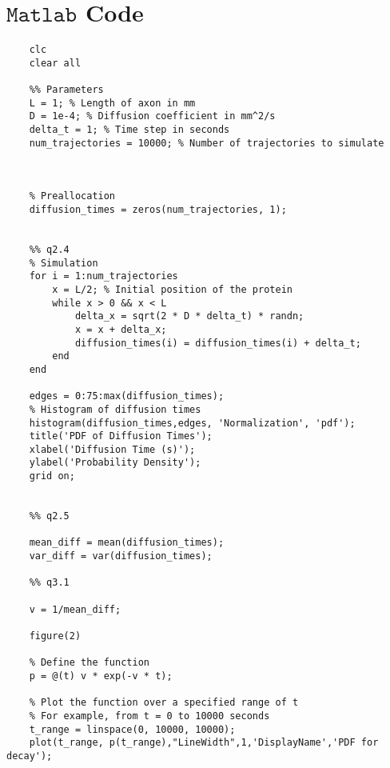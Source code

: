 \appendix

\section{$\mathtt{Matlab}$ Code}

\begin{lstlisting}
    clc
    clear all
    
    %% Parameters
    L = 1; % Length of axon in mm
    D = 1e-4; % Diffusion coefficient in mm^2/s
    delta_t = 1; % Time step in seconds
    num_trajectories = 10000; % Number of trajectories to simulate
    
    
    
    % Preallocation
    diffusion_times = zeros(num_trajectories, 1);
    
    
    %% q2.4
    % Simulation
    for i = 1:num_trajectories
        x = L/2; % Initial position of the protein
        while x > 0 && x < L
            delta_x = sqrt(2 * D * delta_t) * randn;
            x = x + delta_x;
            diffusion_times(i) = diffusion_times(i) + delta_t;
        end
    end
    
    edges = 0:75:max(diffusion_times);
    % Histogram of diffusion times
    histogram(diffusion_times,edges, 'Normalization', 'pdf');
    title('PDF of Diffusion Times');
    xlabel('Diffusion Time (s)');
    ylabel('Probability Density');
    grid on;
    
    
    %% q2.5
    
    mean_diff = mean(diffusion_times);
    var_diff = var(diffusion_times);
    
    %% q3.1
    
    v = 1/mean_diff;
    
    figure(2)
    
    % Define the function
    p = @(t) v * exp(-v * t);
    
    % Plot the function over a specified range of t
    % For example, from t = 0 to 10000 seconds
    t_range = linspace(0, 10000, 10000);
    plot(t_range, p(t_range),"LineWidth",1,'DisplayName','PDF for decay');
    

\end{lstlisting}
